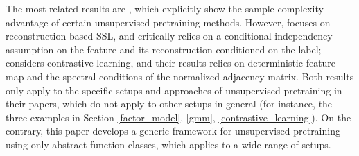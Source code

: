The most related results are \citet{lee2021predicting,haochen2021provable}, which explicitly show the sample complexity advantage of certain unsupervised pretraining methods. However, \citet{lee2021predicting} focuses on reconstruction-based SSL, and critically relies on a conditional independency assumption on the feature and its reconstruction conditioned on the label; 
\citet{haochen2021provable} considers contrastive learning, and their results relies on deterministic feature map and the spectral conditions of the normalized adjacency matrix.
Both results only apply to the specific setups and approaches of unsupervised pretraining in their papers, which do not apply to other setups in general (for instance, the three examples in Section \ref{factor_model}, \ref{gmm}, \ref{contrastive_learning}). On the contrary, this paper develops a generic framework for unsupervised pretraining using only abstract function classes, which applies to a wide range of setups.






